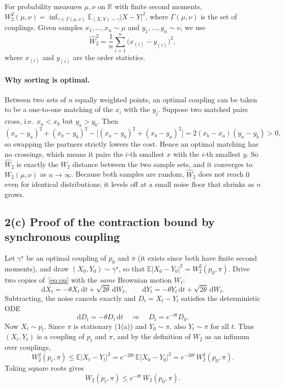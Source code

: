 \documentclass[11pt]{article}
\newcommand{\E}{\mathbb{E}}
\newcommand{\dd}{\mathrm{d}}
\begin{document}
For probability measures $\mu,\nu$ on $\mathbb R$ with finite second moments,
$W_2^2(\mu,\nu) = \inf_{\gamma\in\Gamma(\mu,\nu)} \E_{(X,Y)\sim\gamma}|X-Y|^2$, where $\Gamma(\mu,\nu)$ is the set of couplings.
Given samples $x_1,\dots,x_n\sim\mu$ and $y_1,\dots,y_n\sim\nu$, we use
\[
\widehat W_2^2 = \frac1n\sum_{i=1}^n \bigl(x_{(i)} - y_{(i)}\bigr)^2,
\]
where $x_{(i)}$ and $y_{(i)}$ are the order statistics.

\paragraph{Why sorting is optimal.} Between two sets of $n$ equally weighted points, an optimal coupling can be taken
to be a one-to-one matching of the $x_i$ with the $y_j$. Suppose two matched pairs cross,
i.e.\ $x_a < x_b$ but $y_a > y_b$. Then
\[
(x_a-y_a)^2 + (x_b-y_b)^2 - \bigl[(x_a-y_b)^2 + (x_b-y_a)^2\bigr] = 2(x_b-x_a)(y_a-y_b) > 0,
\]
so swapping the partners strictly lowers the cost. Hence an optimal matching has no crossings, which means it pairs
the $i$-th smallest $x$ with the $i$-th smallest $y$. So $\widehat W_2$ is exactly the $W_2$ distance between the two
sample sets, and it converges to $W_2(\mu,\nu)$ as $n\to\infty$. Because both samples are random, $\widehat W_2$ does not reach
$0$ even for identical distributions; it levels off at a small noise floor that shrinks as $n$ grows.

\subsection*{2(c) Proof of the contraction bound by synchronous coupling}

Let $\gamma^\star$ be an optimal coupling of $p_0$ and $\pi$ (it exists since both have finite second moments), and draw
$(X_0,Y_0)\sim\gamma^\star$, so that $\E|X_0-Y_0|^2 = W_2^2(p_0,\pi)$. Drive two copies of~\eqref{eq:ou} with the
\emph{same} Brownian motion $W_t$:
\[
\dd X_t = -\theta X_t\,\dd t + \sqrt{2\theta}\,\dd W_t,\qquad
\dd Y_t = -\theta Y_t\,\dd t + \sqrt{2\theta}\,\dd W_t .
\]
Subtracting, the noise cancels exactly and $D_t = X_t - Y_t$ satisfies the deterministic ODE
\[
\dd D_t = -\theta D_t\,\dd t \quad\Longrightarrow\quad D_t = e^{-\theta t} D_0 .
\]
Now $X_t\sim p_t$. Since $\pi$ is stationary (1(a)) and $Y_0\sim\pi$, also $Y_t\sim\pi$ for all $t$. Thus $(X_t,Y_t)$ is a
coupling of $p_t$ and $\pi$, and by the definition of $W_2$ as an infimum over couplings,
\[
W_2^2(p_t,\pi) \le \E|X_t-Y_t|^2 = e^{-2\theta t}\,\E|X_0-Y_0|^2 = e^{-2\theta t}\,W_2^2(p_0,\pi).
\]
Taking square roots gives
\[
\boxed{W_2(p_t,\pi) \le e^{-\theta t}\,W_2(p_0,\pi).}
\]
\end{document}
